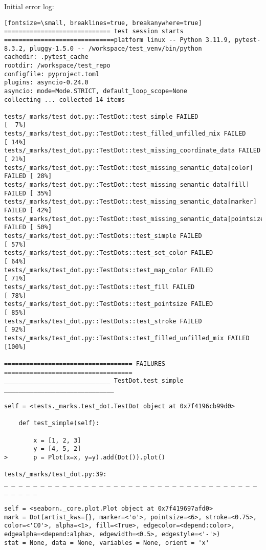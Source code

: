 Initial error log:
\begin{verbatim}[fontsize=\small, breaklines=true, breakanywhere=true]
============================= test session starts ==============================platform linux -- Python 3.11.9, pytest-8.3.2, pluggy-1.5.0 -- /workspace/test_venv/bin/python
cachedir: .pytest_cache
rootdir: /workspace/test_repo
configfile: pyproject.toml
plugins: asyncio-0.24.0
asyncio: mode=Mode.STRICT, default_loop_scope=None
collecting ... collected 14 items

tests/_marks/test_dot.py::TestDot::test_simple FAILED                    [  7%]
tests/_marks/test_dot.py::TestDot::test_filled_unfilled_mix FAILED       [ 14%]
tests/_marks/test_dot.py::TestDot::test_missing_coordinate_data FAILED   [ 21%]
tests/_marks/test_dot.py::TestDot::test_missing_semantic_data[color] FAILED [ 28%]
tests/_marks/test_dot.py::TestDot::test_missing_semantic_data[fill] FAILED [ 35%]
tests/_marks/test_dot.py::TestDot::test_missing_semantic_data[marker] FAILED [ 42%]
tests/_marks/test_dot.py::TestDot::test_missing_semantic_data[pointsize] FAILED [ 50%]
tests/_marks/test_dot.py::TestDots::test_simple FAILED                   [ 57%]
tests/_marks/test_dot.py::TestDots::test_set_color FAILED                [ 64%]
tests/_marks/test_dot.py::TestDots::test_map_color FAILED                [ 71%]
tests/_marks/test_dot.py::TestDots::test_fill FAILED                     [ 78%]
tests/_marks/test_dot.py::TestDots::test_pointsize FAILED                [ 85%]
tests/_marks/test_dot.py::TestDots::test_stroke FAILED                   [ 92%]
tests/_marks/test_dot.py::TestDots::test_filled_unfilled_mix FAILED      [100%]

=================================== FAILURES ===================================
_____________________________ TestDot.test_simple ______________________________

self = <tests._marks.test_dot.TestDot object at 0x7f4196cb99d0>

    def test_simple(self):
    
        x = [1, 2, 3]
        y = [4, 5, 2]
>       p = Plot(x=x, y=y).add(Dot()).plot()

tests/_marks/test_dot.py:39: 
_ _ _ _ _ _ _ _ _ _ _ _ _ _ _ _ _ _ _ _ _ _ _ _ _ _ _ _ _ _ _ _ _ _ _ _ _ _ _ _ 

self = <seaborn._core.plot.Plot object at 0x7f419697afd0>
mark = Dot(artist_kws={}, marker=<'o'>, pointsize=<6>, stroke=<0.75>, color=<'C0'>, alpha=<1>, fill=<True>, edgecolor=<depend:color>, edgealpha=<depend:alpha>, edgewidth=<0.5>, edgestyle=<'-'>)
stat = None, data = None, variables = None, orient = 'x'


\end{verbatim}
